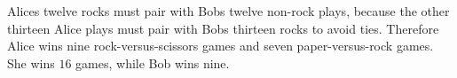 Alice\textquotesingle s twelve rocks must pair with Bob\textquotesingle s twelve non-rock plays, because the other thirteen Alice plays must pair with Bob\textquotesingle s thirteen rocks to avoid ties. Therefore Alice wins nine rock-versus-scissors games and seven paper-versus-rock games. She wins $\boxed{16}$ games, while Bob wins nine.
